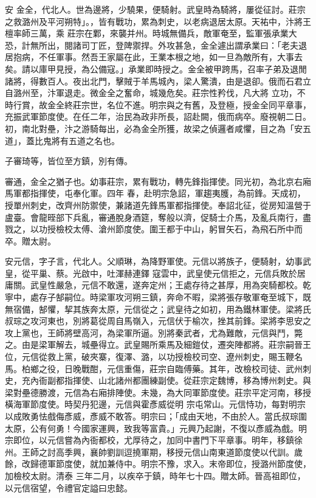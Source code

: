 
\begin{pinyinscope}

 安
 金全，代北人。世為邊將，少驍果，便騎射。武皇時為騎將，屢從征討。莊宗之救潞州及平河朔特」。，皆有戰功，累為刺史，以老病退居太原。天祐中，汴將王檀率師三萬，乘
 莊宗在鄴，來襲并州。時城無備兵，敵軍奄至，監軍張承業大恐，計無所出，閱諸司丁匠，登陴禦捍。外攻甚急，金全遽出謂承業曰：「老夫退居抱病，不任軍事。然吾王家屬在此，王業本根之地，如一旦為敵所有，大事去矣。請以庫甲見授，為公備寇。」承業即時授之。金全被甲跨馬，召率子弟及退閒諸將，得數百人。夜出北門，擊賊于羊馬城內，梁人驚潰，由是退卻。俄而石君立自潞州至，汴軍退走。微金全之奮命，城幾危矣。莊宗性矜伐，凡大將
 立功，不時行賞，故金全終莊宗世，名位不進。明宗與之有舊，及登極，授金全同平章事，充振武軍節度使。在任二年，治民為政非所長，詔赴闕，俄而病卒。廢視朝二日。初，南北對壘，汴之游騎每出，必為金全所獲，故梁之偵邏者咸懼，目之為「安五道」，蓋比鬼將有五道之名也。



 子審琦等，皆位至方鎮，別有傳。



 審通，金全之猶子也。幼事莊宗，累有戰功，轉先鋒指揮使。同光初，為北京右廂馬軍都指揮使，屯奉化軍。四年
 春，赴明宗急詔，軍趨夷臒，為前鋒。天成初，授單州刺史，改齊州防禦使，兼諸道先鋒馬軍都指揮使。奉詔北征，從房知溫營于盧臺。會龍晊部下兵亂，審通脫身酒筵，奪般以濟，促騎士介馬，及亂兵南行，盡戮之，以功授檢校太傅、滄州節度使。圍王都于中山，躬冒矢石，為飛石所中而卒。贈太尉。



 安元信，字子言，代北人。父順琳，為降野軍使。元信以將族子，便騎射，幼事武皇，從平巢、蔡。光啟中，吐渾赫連鐸
 寇雲中，武皇使元信拒之，元信兵敗於居庸關。武皇性嚴急，元信不敢還，遂奔定州；王處存待之甚厚，用為突騎都校。乾寧中，處存子郜嗣位。時梁軍攻河朔三鎮，奔命不暇，梁將張存敬軍奄至城下，既無宿備，郜懼，挈其族奔太原，元信從之；武皇待之如初，用為鐵林軍使。梁將氏叔琮之攻河東也，別將葛從周自馬嶺入，元信伏于榆次，挫其前鋒。梁將李思安之攻上黨也，王師將壁高河，為梁軍所逼。別將秦武者，尤為難敵，元信與鬥，斃
 之。由是梁軍解去，城壘得立。武皇賜所乘馬及細鎧仗，遷突陣都將。莊宗嗣晉王位，元信從救上黨，破夾寨，復澤、潞，以功授檢校司空、遼州刺史，賜玉鞭名馬。柏鄉之役，日晚戰酣，元信重傷，莊宗自臨傅藥。其年，改檢校司徒、武州刺史，充內衙副都指揮使、山北諸州都團練副使。從莊宗定魏博，移為博州刺史。與梁對壘德勝渡，元信為右廂排陣使。未幾，為大同軍節度使。莊宗平定河南，移授橫海軍節度使。時契丹犯邊，元信與霍彥威從明
 宗屯常山。元信恃功，每對明宗以成敗勇怯戲侮彥威，彥威不敢答。明宗曰；「成由天地，不由於人。當氏叔琮圍太原，公有何勇！今國家運興，致我等富貴。」元興乃起謝，不復以彥威為戲。明宗即位，以元信嘗為內衙都校，尤厚待之，加同中書門下平章事。明年，移鎮徐州。王師之討高季興，襄帥劉訓逗撓軍期，移授元信山南東道節度使以代訓。歲餘，改歸德軍節度使，就加兼侍中。明宗不豫，求入。末帝即位，授潞州節度使，加檢校太尉。清泰
 三年二月，以疾卒于鎮，時年七十四。贈太師。晉高祖即位，以元信宿望，令禮官定謚曰忠懿。




\end{pinyinscope}
